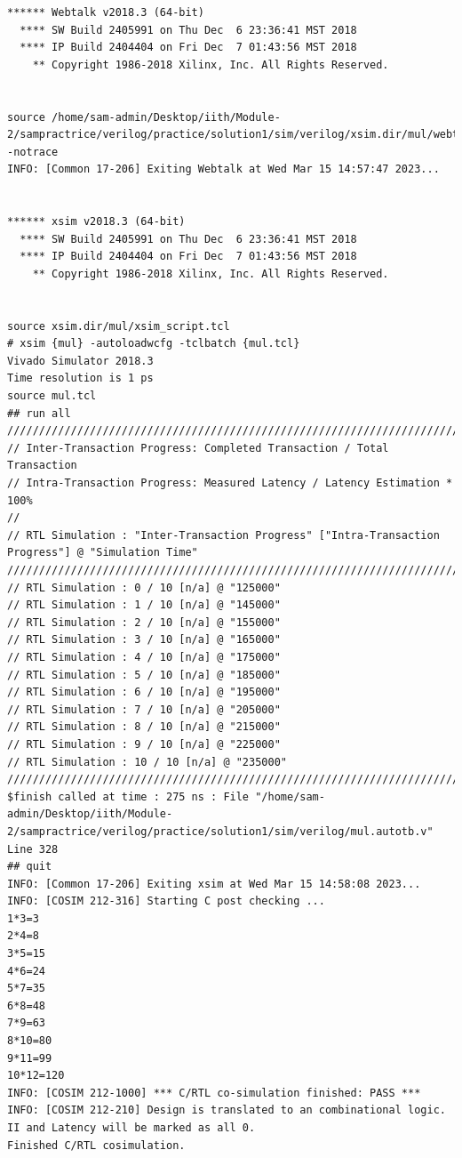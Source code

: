 \documentclass{article}
\begin{document}
\begin{lstlisting}
****** Webtalk v2018.3 (64-bit)
  **** SW Build 2405991 on Thu Dec  6 23:36:41 MST 2018
  **** IP Build 2404404 on Fri Dec  7 01:43:56 MST 2018
    ** Copyright 1986-2018 Xilinx, Inc. All Rights Reserved.


source /home/sam-admin/Desktop/iith/Module-2/sampractrice/verilog/practice/solution1/sim/verilog/xsim.dir/mul/webtalk/xsim_webtalk.tcl -notrace
INFO: [Common 17-206] Exiting Webtalk at Wed Mar 15 14:57:47 2023...


****** xsim v2018.3 (64-bit)
  **** SW Build 2405991 on Thu Dec  6 23:36:41 MST 2018
  **** IP Build 2404404 on Fri Dec  7 01:43:56 MST 2018
    ** Copyright 1986-2018 Xilinx, Inc. All Rights Reserved.


source xsim.dir/mul/xsim_script.tcl
# xsim {mul} -autoloadwcfg -tclbatch {mul.tcl}
Vivado Simulator 2018.3
Time resolution is 1 ps
source mul.tcl
## run all
////////////////////////////////////////////////////////////////////////////////////
// Inter-Transaction Progress: Completed Transaction / Total Transaction
// Intra-Transaction Progress: Measured Latency / Latency Estimation * 100%
//
// RTL Simulation : "Inter-Transaction Progress" ["Intra-Transaction Progress"] @ "Simulation Time"
////////////////////////////////////////////////////////////////////////////////////
// RTL Simulation : 0 / 10 [n/a] @ "125000"
// RTL Simulation : 1 / 10 [n/a] @ "145000"
// RTL Simulation : 2 / 10 [n/a] @ "155000"
// RTL Simulation : 3 / 10 [n/a] @ "165000"
// RTL Simulation : 4 / 10 [n/a] @ "175000"
// RTL Simulation : 5 / 10 [n/a] @ "185000"
// RTL Simulation : 6 / 10 [n/a] @ "195000"
// RTL Simulation : 7 / 10 [n/a] @ "205000"
// RTL Simulation : 8 / 10 [n/a] @ "215000"
// RTL Simulation : 9 / 10 [n/a] @ "225000"
// RTL Simulation : 10 / 10 [n/a] @ "235000"
////////////////////////////////////////////////////////////////////////////////////
$finish called at time : 275 ns : File "/home/sam-admin/Desktop/iith/Module-2/sampractrice/verilog/practice/solution1/sim/verilog/mul.autotb.v" Line 328
## quit
INFO: [Common 17-206] Exiting xsim at Wed Mar 15 14:58:08 2023...
INFO: [COSIM 212-316] Starting C post checking ...
1*3=3
2*4=8
3*5=15
4*6=24
5*7=35
6*8=48
7*9=63
8*10=80
9*11=99
10*12=120
INFO: [COSIM 212-1000] *** C/RTL co-simulation finished: PASS ***
INFO: [COSIM 212-210] Design is translated to an combinational logic. II and Latency will be marked as all 0.
Finished C/RTL cosimulation.


\end{lstlisting}
\vspace{5cm}
\end{document}
